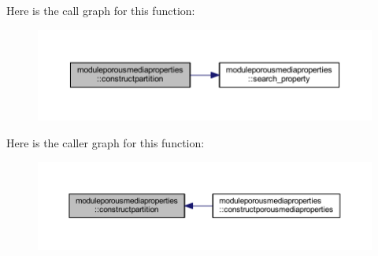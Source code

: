 Here is the call graph for this function\+:\nopagebreak
\begin{figure}[H]
\begin{center}
\leavevmode
\includegraphics[width=350pt]{namespacemoduleporousmediaproperties_a61c528a081f6e7bd050ab2482d187fe5_cgraph}
\end{center}
\end{figure}
Here is the caller graph for this function\+:\nopagebreak
\begin{figure}[H]
\begin{center}
\leavevmode
\includegraphics[width=350pt]{namespacemoduleporousmediaproperties_a61c528a081f6e7bd050ab2482d187fe5_icgraph}
\end{center}
\end{figure}
\mbox{\label{namespacemoduleporousmediaproperties_a3be1252bc0db9785b9746ae093d82a5f}} 
